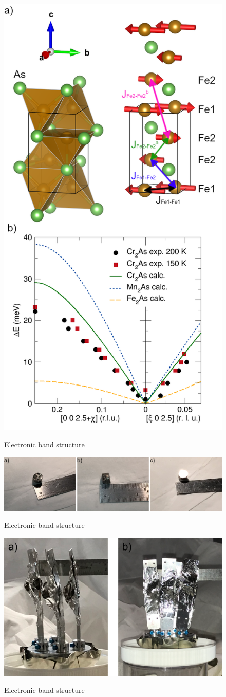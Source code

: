 \documentclass[11pt,edeposit,draftthesis]{uiucthesis2020}
\begin{document}
\begin{mainmatter}
\begin{figure}
\centering\includegraphics[width=0.5\columnwidth]{figures/ch8/Cr2As_INS_magnetic_structure.png} \\
\caption{\label{fig:Cr2As}
Electronic band structure
}
\end{figure}

\begin{figure}
\centering\includegraphics[width=\columnwidth]{figures/ch8/crystal.png} \\
\caption{\label{fig:crystal}
Electronic band structure
}
\end{figure}

\begin{figure}
\centering\includegraphics[width=\columnwidth]{figures/ch8/crystal_array.png} \\
\caption{\label{fig:crystal_array}
Electronic band structure
}
\end{figure}


\end{mainmatter}
\end{document}
